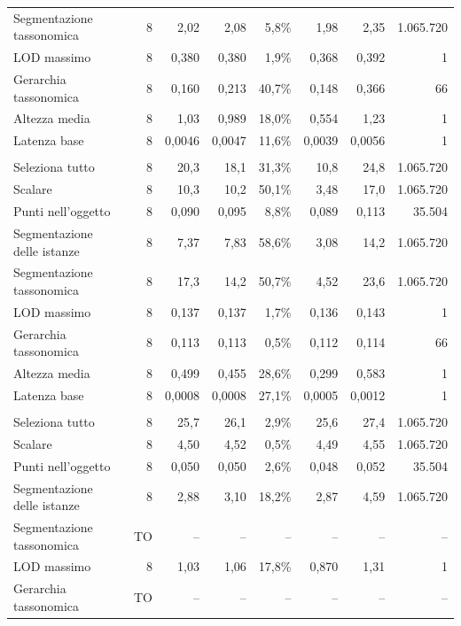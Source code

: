 \begin{small}
\begin{longtable}{lrrrrrr r}
\quad Segmentazione tassonomica & 8 & 2,02 & 2,08 & 5,8\% & 1,98 & 2,35 & 1.065.720 \\
\quad LOD massimo & 8 & 0,380 & 0,380 & 1,9\% & 0,368 & 0,392 & 1 \\
\quad Gerarchia tassonomica & 8 & 0,160 & 0,213 & 40,7\% & 0,148 & 0,366 & 66 \\
\quad Altezza media & 8 & 1,03 & 0,989 & 18,0\% & 0,554 & 1,23 & 1 \\
\quad Latenza base & 8 & 0,0046 & 0,0047 & 11,6\% & 0,0039 & 0,0056 & 1 \\
\addlinespace
\multicolumn{8}{l}{\textbf{Owlready2}}\\
\quad Seleziona tutto & 8 & 20,3 & 18,1 & 31,3\% & 10,8 & 24,8 & 1.065.720 \\
\quad Scalare & 8 & 10,3 & 10,2 & 50,1\% & 3,48 & 17,0 & 1.065.720 \\
\quad Punti nell'oggetto & 8 & 0,090 & 0,095 & 8,8\% & 0,089 & 0,113 & 35.504 \\
\quad Segmentazione delle istanze & 8 & 7,37 & 7,83 & 58,6\% & 3,08 & 14,2 & 1.065.720 \\
\quad Segmentazione tassonomica & 8 & 17,3 & 14,2 & 50,7\% & 4,52 & 23,6 & 1.065.720 \\
\quad LOD massimo & 8 & 0,137 & 0,137 & 1,7\% & 0,136 & 0,143 & 1 \\
\quad Gerarchia tassonomica & 8 & 0,113 & 0,113 & 0,5\% & 0,112 & 0,114 & 66 \\
\quad Altezza media & 8 & 0,499 & 0,455 & 28,6\% & 0,299 & 0,583 & 1 \\
\quad Latenza base & 8 & 0,0008 & 0,0008 & 27,1\% & 0,0005 & 0,0012 & 1 \\
\addlinespace
\multicolumn{8}{l}{\textbf{Oxigraph}}\\
\quad Seleziona tutto & 8 & 25,7 & 26,1 & 2,9\% & 25,6 & 27,4 & 1.065.720 \\
\quad Scalare & 8 & 4,50 & 4,52 & 0,5\% & 4,49 & 4,55 & 1.065.720 \\
\quad Punti nell'oggetto & 8 & 0,050 & 0,050 & 2,6\% & 0,048 & 0,052 & 35.504 \\
\quad Segmentazione delle istanze & 8 & 2,88 & 3,10 & 18,2\% & 2,87 & 4,59 & 1.065.720 \\
\quad Segmentazione tassonomica & \textsf{TO} & -- & -- & -- & -- & -- & -- \\
\quad LOD massimo & 8 & 1,03 & 1,06 & 17,8\% & 0,870 & 1,31 & 1 \\
\quad Gerarchia tassonomica & \textsf{TO} & -- & -- & -- & -- & -- & -- \\

\end{longtable}
\end{small}
